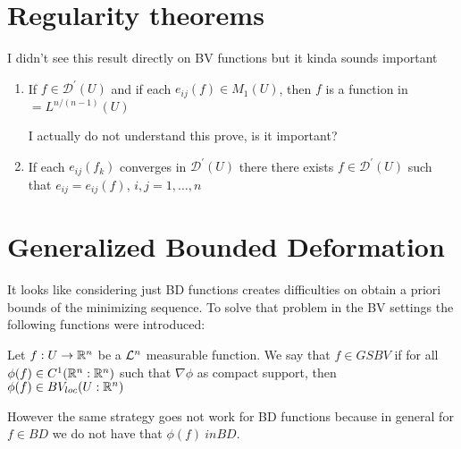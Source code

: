 \section{Regularity theorems}
I didn't see this result directly on BV functions but it kinda sounds important
\begin{theorem}[Regularity]
\begin{enumerate}[label=(\roman*)]
\item If $f \in \mathscr{D}^{\prime}(U)$ and if each $e_{i j}(f) \in M_1(U)$, then $f$ is a function in $=L^{n /(n-1)}(U)$
\begin{question}
I actually do not understand this prove, is it important?
\end{question}
\item If each $e_{ij}(f_k)$ converges in $\mathscr{D}^{\prime}(U)$ there there exists $f\in\mathscr{D}^{\prime}(U)$ such that $e_{ij}=e_{ij}(f)$,  $i,j=1,\ldots,n$
\end{enumerate}
\end{theorem}
\section{Generalized Bounded Deformation}

It looks like considering just BD functions creates difficulties on obtain a priori bounds of the minimizing sequence.
To solve that problem in the BV settings the following functions were introduced:
\begin{definition}
Let $f: U \to \mathbb{R}^n$ be  a ${\mathcal L}^n$ measurable function. We say that $f\in GSBV$ if for all $\phi(f)\in C^1(\mathbb{R}^n:\mathbb{R}^n)$ such that $\nabla\phi$ as compact support, then $\phi(f)\in BV_{loc}(U:\mathbb{R}^n)$
\end{definition}

However the same strategy goes not work for BD functions because in general for $f\in BD$ we do not have that $\phi(f)\ in BD$.

